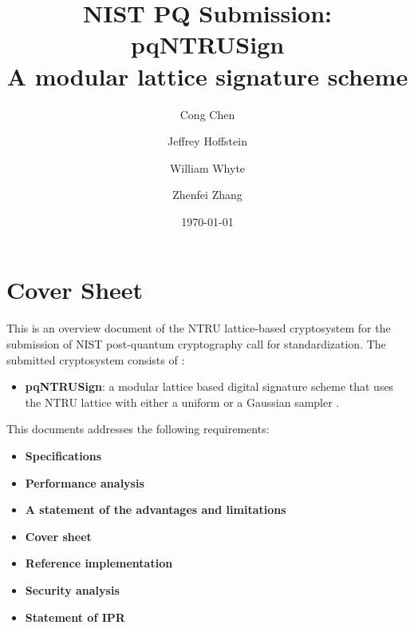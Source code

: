 \documentclass{llncs}
\newcommand{\<}{\langle}
\renewcommand{\>}{\rangle}
\begin{document}
\title{
	NIST PQ Submission: pqNTRUSign\\
	A modular lattice signature scheme
}

\author{Cong Chen  \and Jeffrey Hoffstein   \and William Whyte  \and Zhenfei Zhang  
}
\date{\today}
\maketitle






\section{Cover Sheet}
This is an overview document of the NTRU lattice-based cryptosystem for the submission of NIST post-quantum cryptography call for 
standardization.
The submitted cryptosystem consists of : 

\begin{itemize}
\item {\bf pqNTRUSign}: a modular lattice based digital signature scheme that uses the NTRU lattice with either a uniform \cite{DBLP:conf/pqcrypto/HoffsteinPSSW14} or 
a Gaussian sampler \cite{cryptoeprint:2017:995}.
\end{itemize}

\noindent
This documents addresses the following  requirements:

\begin{itemize}
\item {\bf Specifications}
\item {\bf Performance analysis}
\item {\bf A statement of the advantages and limitations}
\item {\bf Cover sheet}
\item {\bf Reference implementation}
\item {\bf Security analysis}
\item {\bf Statement of IPR}
\end{itemize}
\end{document}
